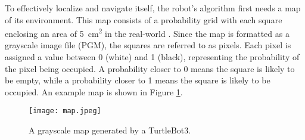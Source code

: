 To effectively localize and navigate itself, the robot's algorithm first needs a map of its environment. This map consists of a probability grid with each square enclosing an area of \qty{5}{cm^2} in the real-world \parencite{hessRealtimeLoopClosure2016}. Since the map is formatted as a grayscale image file (PGM), the squares are referred to as pixels. Each pixel is assigned a value between 0 (white) and 1 (black), representing the probability of the pixel being occupied. A probability closer to 0 means the square is likely to be empty, while a probability closer to 1 means the square is likely to be occupied. An example map is shown in Figure \ref{fig:map}.

\begin{figure}[!htb]
    \texttt{[image: map.jpeg]}
    \centering
    \caption{A grayscale map generated by a TurtleBot3.}
    \label{fig:map}
\end{figure}

